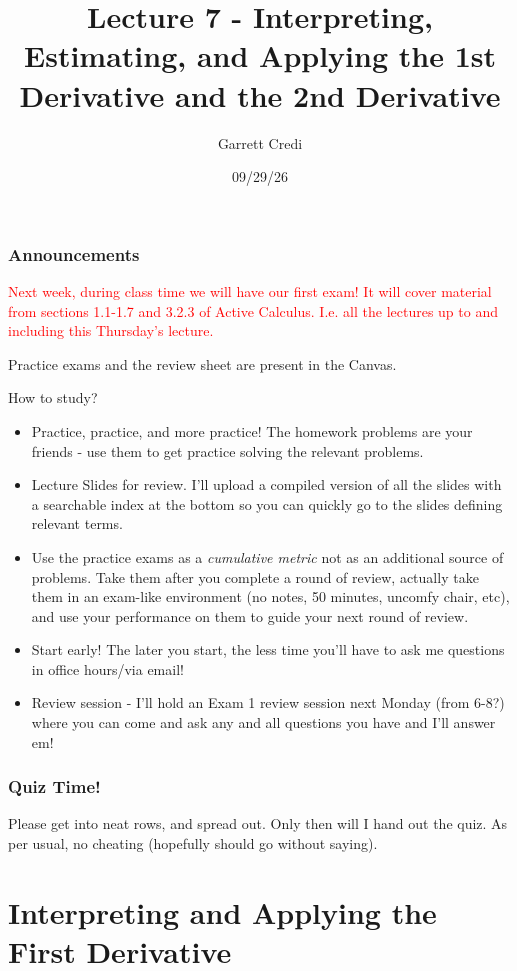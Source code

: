 \documentclass{ltx-talk}
\title{Lecture 7 - Interpreting, Estimating, and Applying the 1st Derivative and the 2nd Derivative}
\author{Garrett Credi}
\date{09/29/26}
\begin{document}
\begin{frame}
  \maketitle
\end{frame}

\begin{frame}
  \frametitle{Announcements}

  \textcolor{red}{Next week, during class time we will have our first exam! It will cover material from sections 1.1-1.7 and 3.2.3 of Active Calculus. \pause
  I.e. all the lectures up to and including this Thursday's lecture. \pause}

  Practice exams and the review sheet are present in the Canvas. \pause

  How to study? \pause
  \begin{itemize}
    \item Practice, practice, and more practice! The homework problems are your friends - use them to get practice solving the relevant problems. \pause
    \item Lecture Slides for review. I'll upload a compiled version of all the slides with a searchable index at the bottom so you can quickly go to 
      the slides defining relevant terms. \pause
    \item Use the practice exams as a \textit{cumulative metric} not as an additional source of problems. Take them after you complete a round of review,
      actually take them in an exam-like environment (no notes, 50 minutes, uncomfy chair, etc), and use your performance on them to guide your next round of review. \pause
    \item Start early! The later you start, the less time you'll have to ask me questions in office hours/via email! \pause
    \item Review session - I'll hold an Exam 1 review session next Monday (from 6-8?) where you can come and ask any and all questions you have and I'll answer em! 
  \end{itemize}
\end{frame}

\begin{frame}
  \frametitle{Quiz Time!}

  Please get into neat rows, and spread out. Only then will I hand out the quiz. As per usual, no cheating (hopefully should go without saying).
\end{frame}

\section{Interpreting and Applying the First Derivative}
\end{document}
